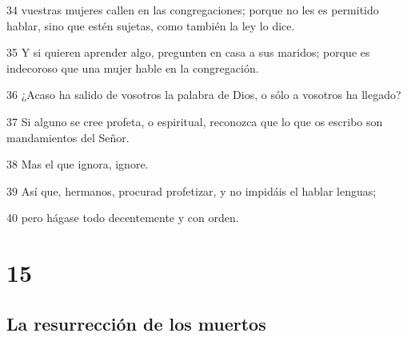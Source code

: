 \par 34 vuestras mujeres callen en las congregaciones; porque no les es permitido hablar, sino que estén sujetas, como también la ley lo dice.
\par 35 Y si quieren aprender algo, pregunten en casa a sus maridos; porque es indecoroso que una mujer hable en la congregación.
\par 36 ¿Acaso ha salido de vosotros la palabra de Dios, o sólo a vosotros ha llegado?
\par 37 Si alguno se cree profeta, o espiritual, reconozca que lo que os escribo son mandamientos del Señor.
\par 38 Mas el que ignora, ignore.
\par 39 Así que, hermanos, procurad profetizar, y no impidáis el hablar lenguas;
\par 40 pero hágase todo decentemente y con orden.

\chapter{15}

\section*{La resurrección de los muertos}

